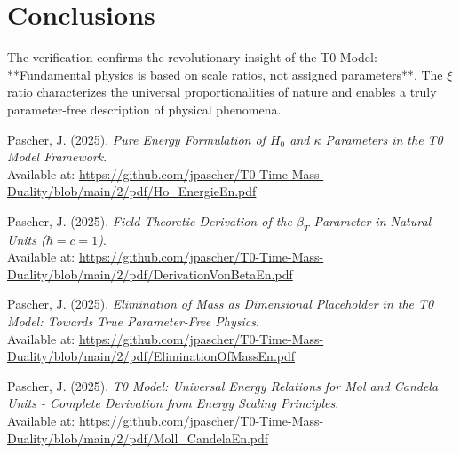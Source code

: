 \documentclass[12pt,a4paper]{article}
\begin{document}
	\section{Conclusions}
	
	The verification confirms the revolutionary insight of the T0 Model: **Fundamental physics is based on scale ratios, not assigned parameters**. The $\xi$ ratio characterizes the universal proportionalities of nature and enables a truly parameter-free description of physical phenomena.
	


	
	\begin{thebibliography}{9}
		
		Pascher, J. (2025). \textit{Pure Energy Formulation of $H_0$ and $\kappa$ Parameters in the T0 Model Framework}. \\
		Available at: \url{https://github.com/jpascher/T0-Time-Mass-Duality/blob/main/2/pdf/Ho_EnergieEn.pdf}
		
		Pascher, J. (2025). \textit{Field-Theoretic Derivation of the $\beta_T$ Parameter in Natural Units ($\hbar = c = 1$)}. \\
		Available at: \url{https://github.com/jpascher/T0-Time-Mass-Duality/blob/main/2/pdf/DerivationVonBetaEn.pdf}
		
		Pascher, J. (2025). \textit{Elimination of Mass as Dimensional Placeholder in the T0 Model: Towards True Parameter-Free Physics}. \\
		Available at: \url{https://github.com/jpascher/T0-Time-Mass-Duality/blob/main/2/pdf/EliminationOfMassEn.pdf}
		
		Pascher, J. (2025). \textit{T0 Model: Universal Energy Relations for Mol and Candela Units - Complete Derivation from Energy Scaling Principles}. \\
		Available at: \url{https://github.com/jpascher/T0-Time-Mass-Duality/blob/main/2/pdf/Moll_CandelaEn.pdf}
		
	\end{thebibliography}
	
\end{document}
